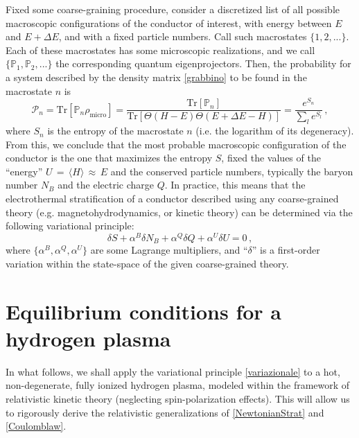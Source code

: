 \documentclass[a4paper, amsfonts, amssymb, amsmath, reprint, showkeys, nofootinbib, twoside, onecolumn,notitlepage]{revtex4-1}
\theoremstyle{definition}
\theoremstyle{theorem}
\begin{document}
Fixed some coarse-graining procedure, consider a discretized list of all possible macroscopic configurations of the conductor of interest, with energy between $E$ and $E{+}\Delta E$, and with a fixed particle numbers. Call such macrostates $\{1,2,...\}$. Each of these macrostates has some microscopic realizations, and we call $\{\mathbb{P}_1,\mathbb{P}_2,...\}$ the corresponding quantum eigenprojectors. Then, the probability for a system described by the density matrix \eqref{grabbino} to be found in the macrostate $n$ is
\begin{equation}
\mathcal{P}_n =\text{Tr}[\mathbb{P}_n\rho_\text{micro}]=\dfrac{\text{Tr}[\mathbb{P}_n]}{\text{Tr}[\Theta(H{-}E)\Theta(E{+}\Delta E{-}H)]} = \dfrac{e^{S_n}}{\sum_l e^{S_l}} \, ,
\end{equation}
where $S_n$ is the entropy of the macrostate $n$ (i.e. the logarithm of its degeneracy). From this, we conclude that the most probable macroscopic configuration of the conductor is the one that maximizes the entropy 
$S$, fixed the values of the ``energy'' $U\,{=}\,\langle H\rangle\, {\approx} \, E$ and the conserved particle numbers, typically the baryon number 
$N_B$ and the electric charge $Q$. In practice, this means that the electrothermal stratification of a conductor described using any coarse-grained theory (e.g. magnetohydrodynamics, or kinetic theory) can be determined via the following variational principle:
\begin{equation}\label{variazionale}
\boxed{\delta S +\alpha^B \delta N_B +\alpha^Q \delta Q +\alpha^U \delta U=0 \, ,}
\end{equation}
where $\{\alpha^B,\alpha^Q,\alpha^U\}$ are some Lagrange multipliers, and ``$\delta$'' is a first-order variation within the state-space of the given coarse-grained theory.


\newpage

\section{Equilibrium conditions for a hydrogen plasma}
\vspace{-0.3cm}

In what follows, we shall apply the variational principle \eqref{variazionale} to a hot, non-degenerate, fully ionized hydrogen plasma, modeled within the framework of relativistic kinetic theory (neglecting spin-polarization effects). This will allow us to rigorously derive the relativistic generalizations of \eqref{NewtonianStrat} and \eqref{Coulomblaw}.
\end{document}
